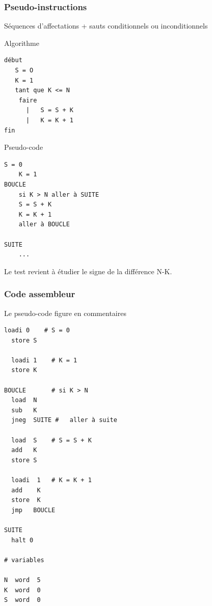 \begin{frame}[containsverbatim]
  \frametitle{Pseudo-instructions}
Séquences d'affectations + sauts conditionnels ou inconditionnels

\begin{multicols}{2}
\small
\alert{Algorithme}
\begin{lstlisting}[frame=single]
début
   S = O
   K = 1
   tant que K <= N
    faire
      |   S = S + K
      |   K = K + 1
fin
\end{lstlisting}
  \break
 \alert{Pseudo-code}
\begin{lstlisting}[frame=single]
    S = 0
    K = 1
BOUCLE
    si K > N aller à SUITE
    S = S + K
    K = K + 1
    aller à BOUCLE

SUITE
    ...
\end{lstlisting}
\end{multicols}
Le test revient à étudier le signe de la différence N-K.
\end{frame}



\begin{frame}[containsverbatim]
\frametitle{Code assembleur}
Le pseudo-code figure en commentaires
\begin{multicols*}{2}
\scriptsize
\begin{lstlisting}[frame=single]
  loadi 0    # S = 0
  store S

  loadi 1    # K = 1
  store K

BOUCLE       # si K > N 
  load  N    
  sub   K
  jneg  SUITE #   aller à suite
    
  load  S    # S = S + K 
  add   K 
  store S

  loadi  1   # K = K + 1
  add    K
  store  K
  jmp   BOUCLE

SUITE
  halt 0

# variables

N  word  5
K  word  0
S  word  0
\end{lstlisting}
\end{multicols*}
\end{frame}

